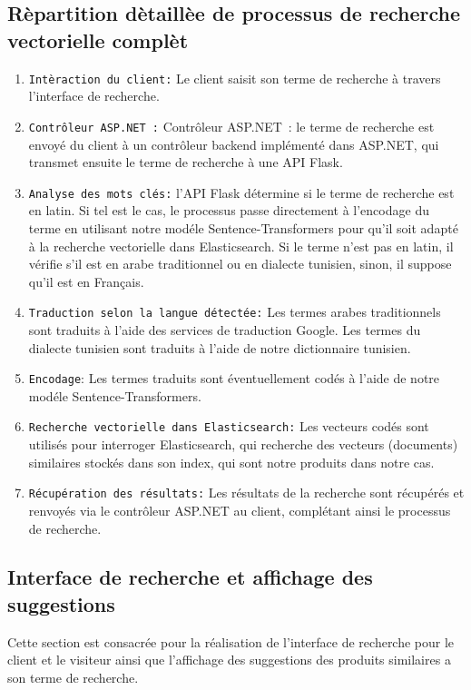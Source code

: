 \subsection{Rèpartition dètaillèe de processus de recherche vectorielle complèt}
\begin{enumerate}
	\item \texttt{Intèraction du client:} Le client saisit son terme de recherche à travers l'interface de recherche.
	\item \texttt{Contrôleur ASP.NET :} Contrôleur ASP.NET : le terme de recherche est envoyé du client à un contrôleur backend implémenté dans ASP.NET, qui transmet ensuite le terme de recherche à une API Flask.
	\item \texttt{Analyse des mots clés:} l'API Flask détermine si le terme de recherche est en latin. Si tel est le cas, le processus passe directement à l'encodage du terme en utilisant notre modéle Sentence-Transformers pour qu'il soit adapté à la recherche vectorielle dans Elasticsearch. Si le terme n'est pas en latin, il vérifie s'il est en arabe traditionnel ou en dialecte tunisien, sinon, il suppose qu'il est en Français.
	\item \texttt{Traduction selon la langue détectée:} Les termes arabes traditionnels sont traduits à l'aide des services de traduction Google. Les termes du dialecte tunisien sont traduits à l'aide de notre dictionnaire tunisien.
	\item \texttt{Encodage}: Les termes traduits sont éventuellement codés à l'aide de notre modéle Sentence-Transformers.
	\item \texttt{Recherche vectorielle dans Elasticsearch:} Les vecteurs codés sont utilisés pour interroger Elasticsearch, qui recherche des vecteurs (documents) similaires stockés dans son index, qui sont notre produits dans notre cas.
	\item \texttt{Récupération des résultats:} Les résultats de la recherche sont récupérés et renvoyés via le contrôleur ASP.NET au client, complétant ainsi le processus de recherche.
\end{enumerate}


\subsection{Interface de recherche et affichage des suggestions}
\noindent
Cette section est consacrée pour la réalisation de l'interface de recherche pour le client et le visiteur ainsi que l'affichage des suggestions des produits similaires a son terme de recherche. \\

